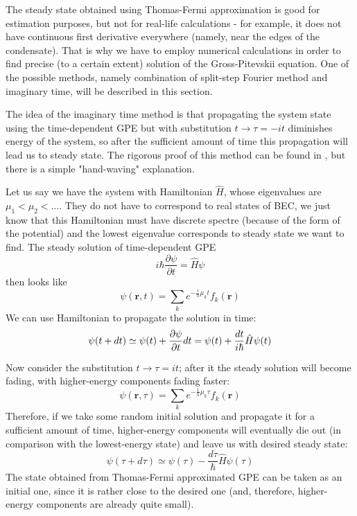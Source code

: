 \documentclass[12pt,notitlepage]{report}
\author{Bogdan Opanchuk}
\begin{document}
The steady state obtained using Thomas-Fermi approximation is good for estimation purposes, but not for
real-life calculations - for example, it does not have continuous first derivative everywhere (namely,
near the edges of the condensate). That is why we have to employ numerical calculations in order
to find precise (to a certain extent) solution of the Gross-Pitevskii equation. One of the possible methods, 
namely combination of split-step Fourier method and imaginary time, will be described in this section.

The idea of the imaginary time method is that propagating the system state using the time-dependent GPE
but with substitution $t \rightarrow \tau = -it$ diminishes energy of the system, so after the sufficient
amount of time this propagation will lead us to steady state. The rigorous proof of this method can be found in
\cite{gpe_ngf}, but there is a simple "hand-waving" explanation.

Let us say we have the system with Hamiltonian $\hat{H}$, whose eigenvalues are $\mu_1 < \mu_2 < ...$.
They do not have to correspond to real states of BEC, we just know that this Hamiltonian must have discrete
spectre (because of the form of the potential) and the lowest eigenvalue corresponds to steady state we want
to find. The steady solution of time-dependent GPE
\[ i \hbar \frac{\partial \psi}{\partial t} = \hat{H} \psi \]
then looks like
\[ \psi(\mathbf{r}, t) = \sum_k e^{-\frac{i}{h} \mu_k t} f_k(\mathbf{r}) \]
We can use Hamiltonian to propagate the solution in time:
\[ 
\psi(t + dt) \simeq \psi(t) + \frac{\partial \psi}{\partial t} dt = \\
\psi(t) + \frac{dt}{i \hbar} \hat{H} \psi(t)
\]

Now consider the substitution $t \rightarrow \tau = it$; after it the steady solution will become fading, with
higher-energy components fading faster:
\begin{equation}
\label{split_step_steady_state:general_solution_imaginary_time}
\psi(\mathbf{r}, \tau) = \sum_k e^{-\frac{1}{h} \mu_k \tau} f_k(\mathbf{r})
\end{equation}
Therefore, if we take some random initial solution and propagate it for a sufficient amount of time, higher-energy
components will eventually die out (in comparison with the lowest-energy state) and leave us with desired 
steady state:
\begin{equation}
\label{split_step_steady_state:iterative_process}
\psi(\tau + d\tau) \simeq \psi(\tau) - \frac{d\tau}{\hbar} \hat{H} \psi(\tau)
\end{equation}
The state obtained from Thomas-Fermi approximated GPE can be taken as an initial one, since it is rather close
to the desired one (and, therefore, higher-energy components are already quite small).
\end{document}
